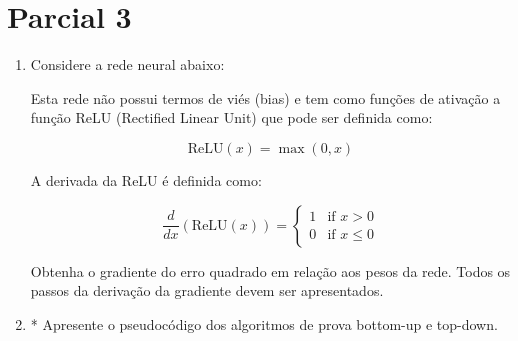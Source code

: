 \documentclass{article}
\begin{document}
\section{Parcial 3}

\begin{enumerate}

    \item  Considere a rede neural abaixo:
    
    \begin{figure}[!ht]
        \centering
    \end{figure}

    Esta rede não possui termos de viés (bias) e tem como funções de ativação a função ReLU (Rectified Linear Unit) que pode ser definida como:

    \begin{equation}
        \text{ReLU}(x) = \max(0, x)
    \end{equation}

    A derivada da ReLU é definida como:

    \begin{equation}
            \frac{d}{dx}(\text{ReLU}(x)) =
            \begin{cases}
            1 & \text{if } x > 0 \\
            0 & \text{if } x \leq 0
            \end{cases}            
    \end{equation}

    Obtenha o gradiente do erro quadrado em relação aos pesos da rede. Todos os passos da derivação da gradiente devem ser apresentados.

    \item * Apresente o pseudocódigo dos algoritmos de prova bottom-up e top-down.


\end{enumerate}
\end{document}
